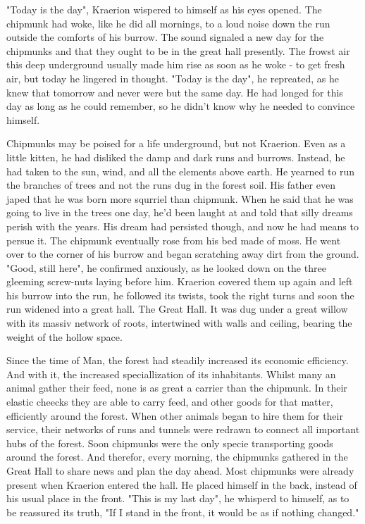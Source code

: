 \documentclass[smalldemyvopaper,11pt,twoside,onecolumn,openright,extrafontsizes]{memoir}
\begin{document}
"Today is the day", Kraerion wispered to himself as his eyes opened. The chipmunk had woke, like he did all mornings, to a loud noise down the run outside the comforts of his burrow. The sound signaled a new day for the chipmunks and that they ought to be in the great hall presently. The frowst air this deep underground usually made him rise as soon as he woke - to get fresh air, but today he lingered in thought.
"Today is the day", he repreated, as he knew that tomorrow and never were but the same day. He had longed for this day as long as he could remember, so he didn't know why he needed to convince himself.

Chipmunks may be poised for a life underground, but not Kraerion. Even as a little kitten, he had disliked the damp and dark runs and burrows. Instead, he had taken to the sun, wind, and all the elements above earth. He yearned to run the branches of trees and not the runs dug in the forest soil. His father even japed that he was born more squrriel than chipmunk. When he said that he was going to live in the trees one day, he'd been laught at and told that silly dreams perish with the years. His dream had persisted though, and now he had means to persue it. 
  The chipmunk eventually rose from his bed made of moss. He went over to the corner of his burrow and began scratching away dirt from the ground.
"Good, still here", he confirmed anxiously, as he looked down on the three gleeming screw-nuts laying before him. Kraerion covered them up again and left his burrow into the run, he followed its twists, took the right turns and soon the run widened into a great hall. The Great Hall. It was dug under a great willow with its massiv network of roots, intertwined with walls and ceiling, bearing the weight of the hollow space.

Since the time of Man, the forest had steadily increased its economic efficiency. And with it, the increased speciallization of its inhabitants. Whilst many an animal gather their feed, none is as great a carrier than the chipmunk. In their elastic cheecks they are able to carry feed, and other goods for that matter, efficiently around the forest. When other animals began to hire them for their service, their networks of runs and tunnels were redrawn to connect all important hubs of the forest. Soon chipmunks were the only specie transporting goods around the forest. And therefor, every morning, the chipmunks gathered in the Great Hall to share news and plan the day ahead.
  Most chipmunks were already present when Kraerion entered the hall. He placed himself in the back, instead of his usual place in the front.
"This is my last day", he whisperd to himself, as to be reassured its truth, "If I stand in the front, it would be as if nothing changed."
\end{document}
